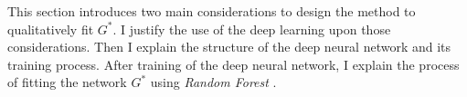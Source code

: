 This section introduces two main considerations to design the method to qualitatively fit $G^*$.
I justify the use of the deep learning upon those considerations.
Then I explain the structure of the deep neural network and its training process.
After training of the deep neural network, I explain the process of fitting the network $G^*$ using \textit{Random Forest} \citep{rf, genie3}.
 
 

